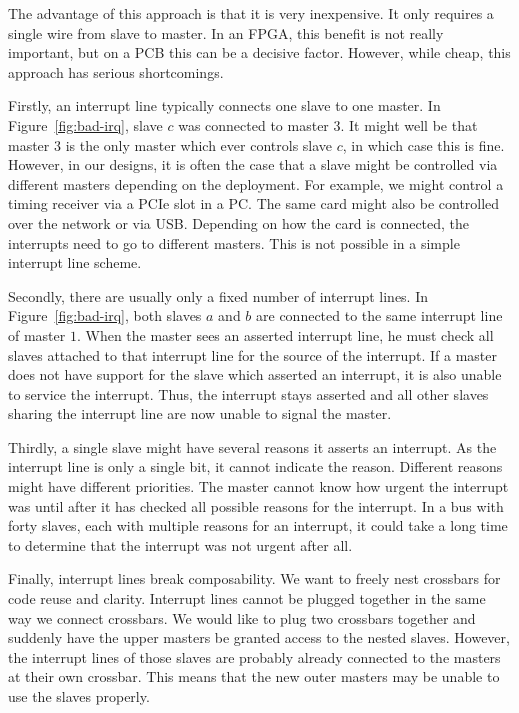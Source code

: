 \documentclass[a4paper]{jacow}
\begin{document}
The advantage of this approach is that it is very inexpensive.
It only requires a single wire from slave to master.
In an FPGA, this benefit is not really important, 
but on a PCB this can be a decisive factor.
However, while cheap, this approach has serious shortcomings.

Firstly, an interrupt line typically connects one slave to one master.
In Figure~\ref{fig:bad-irq}, slave $c$ was connected to master $3$.
It might well be that master $3$ is the only master which ever controls
slave $c$, in which case this is fine.
However, in our designs, it is often the case that a slave might be
controlled via different masters depending on the deployment.
For example, we might control a timing receiver via a PCIe slot in a PC.
The same card might also be controlled over the network or via USB.
Depending on how the card is connected, the interrupts need to go to
different masters.
This is not possible in a simple interrupt line scheme.

Secondly, there are usually only a fixed number of interrupt lines.
In Figure~\ref{fig:bad-irq}, both slaves $a$ and $b$ are connected to the
same interrupt line of master $1$.
When the master sees an asserted interrupt line, he must check all slaves
attached to that interrupt line for the source of the interrupt.
If a master does not have support for the slave which asserted an
interrupt, it is also unable to service the interrupt.
Thus, the interrupt stays asserted and all other slaves sharing the
interrupt line are now unable to signal the master.

Thirdly, a single slave might have several reasons it asserts an interrupt.  
As the interrupt line is only a single bit, it cannot indicate the reason.
Different reasons might have different priorities.
The master cannot know how urgent the interrupt was until after it has
checked all possible reasons for the interrupt.
In a bus with forty slaves, each with multiple reasons for an interrupt,
it could take a long time to determine that the interrupt was not urgent
after all.

Finally, interrupt lines break composability.
We want to freely nest crossbars for code reuse and clarity.
Interrupt lines cannot be plugged together in the same way we connect
crossbars.
We would like to plug two crossbars together and suddenly have the upper
masters be granted access to the nested slaves.
However, the interrupt lines of those slaves are probably already connected
to the masters at their own crossbar.
This means that the new outer masters may be unable to use the slaves
properly.
\end{document}
